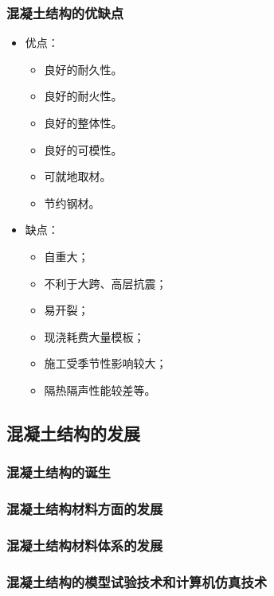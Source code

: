 \documentclass{article}
\begin{document}
\subsubsection{混凝土结构的优缺点}
\begin{itemize}
      \item 优点：
            \begin{itemize}
                  \item 良好的耐久性。
                  \item 良好的耐火性。
                  \item 良好的整体性。
                  \item 良好的可模性。
                  \item 可就地取材。
                  \item 节约钢材。
            \end{itemize}
      \item 缺点：
            \begin{itemize}
                  \item 自重大；
                  \item 不利于大跨、高层抗震；
                  \item 易开裂；
                  \item 现浇耗费大量模板；
                  \item 施工受季节性影响较大；
                  \item 隔热隔声性能较差等。
            \end{itemize}
\end{itemize}
\subsection{混凝土结构的发展}
\subsubsection{混凝土结构的诞生}
\subsubsection{混凝土结构材料方面的发展}
\subsubsection{混凝土结构材料体系的发展}
\subsubsection{混凝土结构的模型试验技术和计算机仿真技术}
\end{document}
